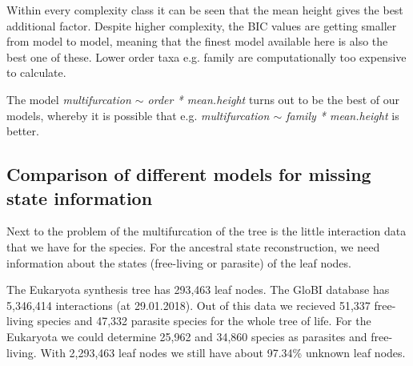       Within every complexity class it can be seen that the mean height gives the best additional factor.
        Despite higher complexity, the BIC values are getting smaller from model to model, meaning that 
        the finest model available here is also the best one of these. Lower order taxa e.g. family are 
        computationally too expensive to calculate.

      The model \textit{multifurcation $\sim$ order * mean.height} turns out to be the best of our models, 
        whereby it is possible that e.g. \textit{multifurcation $\sim$ family * mean.height} is better. \\

    \subsection{Comparison of different models for missing state information}
      Next to the problem of the multifurcation of the tree is the little interaction data that we have 
        for the species. For the ancestral state reconstruction, we need information about the states 
        (free-living or parasite) of the leaf nodes.
        
      The Eukaryota synthesis tree has 293,463 leaf nodes. The GloBI database has 5,346,414 interactions 
        (at 29.01.2018). Out of this data we recieved 51,337 free-living species and 47,332 parasite 
        species for the whole tree of life. For the Eukaryota we could determine 25,962 and 34,860 
        species as parasites and free-living. With 2,293,463 leaf nodes we still have about 97.34\% 
        unknown leaf nodes.
      
